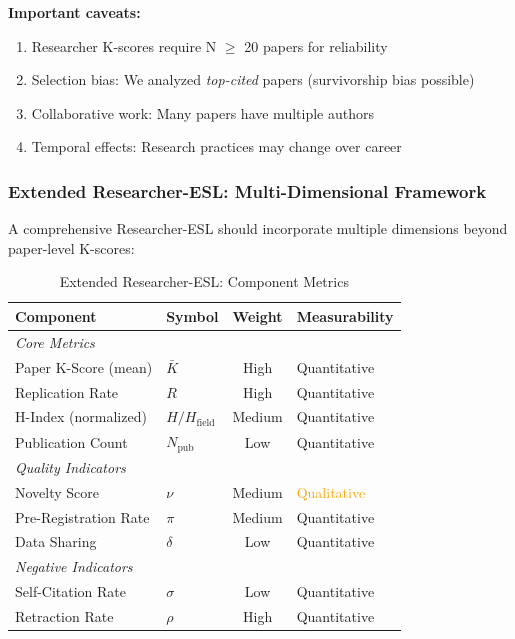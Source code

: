 \documentclass[11pt,a4paper]{article}
\begin{document}
\textbf{Important caveats:}
\begin{enumerate}
    \item Researcher K-scores require N $\geq$ 20 papers for reliability
    \item Selection bias: We analyzed \textit{top-cited} papers (survivorship bias possible)
    \item Collaborative work: Many papers have multiple authors
    \item Temporal effects: Research practices may change over career
\end{enumerate}

\subsubsection{Extended Researcher-ESL: Multi-Dimensional Framework}

A comprehensive Researcher-ESL should incorporate multiple dimensions beyond paper-level K-scores:

\begin{table}[h]
\centering
\caption{Extended Researcher-ESL: Component Metrics}
\begin{tabular}{llcl}
\toprule
\textbf{Component} & \textbf{Symbol} & \textbf{Weight} & \textbf{Measurability} \\
\midrule
\multicolumn{4}{l}{\textit{Core Metrics}} \\
Paper K-Score (mean) & $\bar{K}$ & High & \textcolor{green!60!black}{Quantitative} \\
Replication Rate & $R$ & High & \textcolor{green!60!black}{Quantitative} \\
H-Index (normalized) & $H/H_{\text{field}}$ & Medium & \textcolor{green!60!black}{Quantitative} \\
Publication Count & $N_{\text{pub}}$ & Low & \textcolor{green!60!black}{Quantitative} \\
\midrule
\multicolumn{4}{l}{\textit{Quality Indicators}} \\
Novelty Score & $\nu$ & Medium & \textcolor{orange}{Qualitative} \\
Pre-Registration Rate & $\pi$ & Medium & \textcolor{green!60!black}{Quantitative} \\
Data Sharing & $\delta$ & Low & \textcolor{green!60!black}{Quantitative} \\
\midrule
\multicolumn{4}{l}{\textit{Negative Indicators}} \\
Self-Citation Rate & $\sigma$ & Low & \textcolor{green!60!black}{Quantitative} \\
Retraction Rate & $\rho$ & High & \textcolor{green!60!black}{Quantitative} \\
\bottomrule
\end{tabular}
\end{table}
\end{document}
